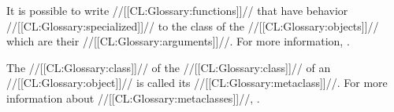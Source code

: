 It is possible to write //[[CL:Glossary:functions]]// that have behavior //[[CL:Glossary:specialized]]//
to the class of the //[[CL:Glossary:objects]]// which are their //[[CL:Glossary:arguments]]//.
For more information, \seesection\GFsAndMethods.

The //[[CL:Glossary:class]]// of the //[[CL:Glossary:class]]// of an //[[CL:Glossary:object]]// 
is called its //[[CL:Glossary:metaclass]]//.
For more information about //[[CL:Glossary:metaclasses]]//,
\seesection\MetaObjects.
